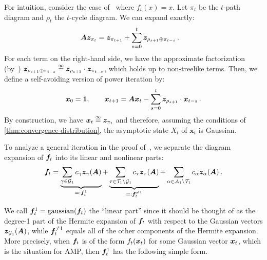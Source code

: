 \begin{example}
For intuition, consider
the case of~
where $f_t(x) = x$.
Let $\pi_t$ be the $t$-path
diagram and $\rho_t$ the $t$-cycle
diagram. We can expand exactly:
\begin{align*}
    {\bm A} {\bm z}_{\pi_t} &= {\bm z}_{\pi_{t+1}} + \sum_{s = 0}^t {\bm z}_{\rho_{s+1} \oplus \pi_{t-s}}\,.
\end{align*}
For each term on the right-hand side, we have the approximate factorization (by~) ${\bm z}_{\rho_{s+1} \oplus \pi_{t-s}} \overset{\infty}{=} {\bm z}_{\rho_{s+1}} \cdot {\bm z}_{\pi_{t-s}}$,
which holds up to non-treelike terms.
Then, we define a self-avoiding version of power iteration by:
\[
    {\bm x}_0 = \bm{1}, \qquad {\bm x}_{t+1} = {\bm A} {\bm x}_t - \sum_{s = 0}^t {\bm z}_{\rho_{s+1}} \cdot {\bm x}_{t-s}\,.
\]
By construction, we have ${\bm x}_t \overset{\infty}{=} {\bm z}_{\pi_t}$ and therefore, assuming the conditions of \cref{thm:convergence-distribution}, the asymptotic state $X_t$ of $\bm x_t$ is Gaussian.
\end{example}

To analyze a general iteration in the proof of~, we separate the diagram expansion of ${\bm f}_t$ into its linear and nonlinear parts:
\begin{equation*}\label{eq:linear-nonlinear}
    {\bm f}_t = \underbrace{\sum_{\gamma \in {\cal G}_1} c_\gamma {\bm z}_\gamma({\bm A})}_{=: {\bm f}^1_t} + \underbrace{\sum_{\tau \in {\cal T}_1 \setminus {\cal G}_1} c_\tau {\bm z}_\tau({\bm A})}_{=: {\bm f}^{\neq 1}_t} + \sum_{\alpha \in {\cal A}_1 \setminus {\cal T}_1} c_\alpha {\bm z}_\alpha({\bm A})\,.
\end{equation*}

\noindent We call ${\bm f}^1_t = \textnormal{gaussian}({\bm f}_t)$ the ``linear part'' since it should be thought of as the degree-1 part of the Hermite expansion
of ${\bm f}_t$ with respect to the Gaussian vectors ${\bm z}_{{\cal G}_1}({\bm A})$,
while ${\bm f}^{\neq 1}_t$ equals all of the other components of the Hermite expansion.
More precisely, when ${\bm f}_t$ is of the form $f_t({\bm x}_{t})$ for some Gaussian vector ${\bm x}_{t}$, which is the situation for AMP, then ${\bm f}^{1}_t$ has the following simple form.


